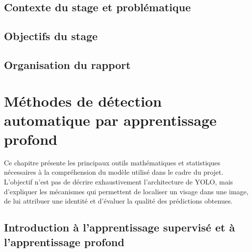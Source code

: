 \documentclass[11pt,a4paper]{report}
\begin{document}

\section*{Contexte du stage et problématique}

\section*{Objectifs du stage}

\section*{Organisation du rapport}



\chapter{Méthodes de détection automatique par apprentissage profond}
\label{chap:methode}

Ce chapitre présente les principaux outils mathématiques et statistiques
nécessaires à la compréhension du modèle utilisé dans le cadre du projet.
L'objectif n'est pas de décrire exhaustivement l'architecture de YOLO, mais
d'expliquer les mécanismes qui permettent de localiser un visage dans une image,
de lui attribuer une identité et d'évaluer la qualité des prédictions obtenues.

\section{Introduction à l'apprentissage supervisé et à l'apprentissage profond}
\end{document}

